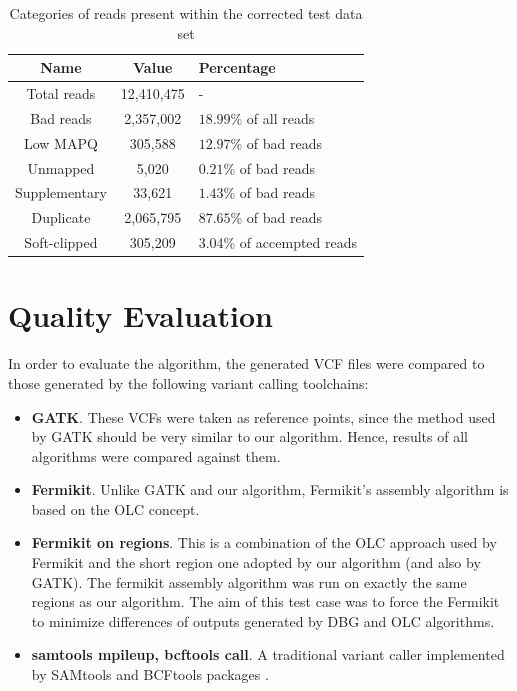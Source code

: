 \begin{table}[h]
\begin{center}
\caption{Categories of reads present within the corrected test data set}
\label{tab:corrected-set-categories}
\begin{tabular}{| c | c | p{5cm} |}
\hline
Name & Value & Percentage \\
\hline
Total reads & 12,410,475 & - \\
\hline
Bad reads & 2,357,002  & $18.99$\% of all reads \\
\hline
Low MAPQ & 305,588 & $12.97$\% of bad reads \\
\hline
Unmapped & 5,020 & $0.21$\% of bad reads \\
\hline
Supplementary & 33,621 & $1.43$\% of bad reads \\
\hline
Duplicate & 2,065,795 & $87.65$\% of bad reads \\
\hline
Soft-clipped & 305,209 & $3.04$\% of accempted reads \\
\hline
\end{tabular}
\end{center}
\end{table}

\section{Quality Evaluation}
\label{sec:quality-evaulation}

In order to evaluate the algorithm, the generated VCF files were compared to those generated by the following variant calling toolchains:
\begin{itemize}
\item \textbf{GATK}. These VCFs were taken as reference points, since the method used by GATK should be very similar to our algorithm. Hence, results of all algorithms were compared against them.
\item \textbf{Fermikit}. Unlike GATK and our algorithm, Fermikit's assembly algorithm is based on the OLC concept.
\item \textbf{Fermikit on regions}. This is a combination of the OLC approach used by Fermikit and the short region one adopted by our algorithm (and also by GATK). The fermikit assembly algorithm was run on exactly the same regions as our algorithm. The aim of this test case was to force the Fermikit to minimize differences of outputs generated by DBG and OLC algorithms.
\item \textbf{samtools mpileup, bcftools call}. A traditional variant caller implemented by SAMtools and BCFtools packages \cite{samtools}.
\end{itemize}


